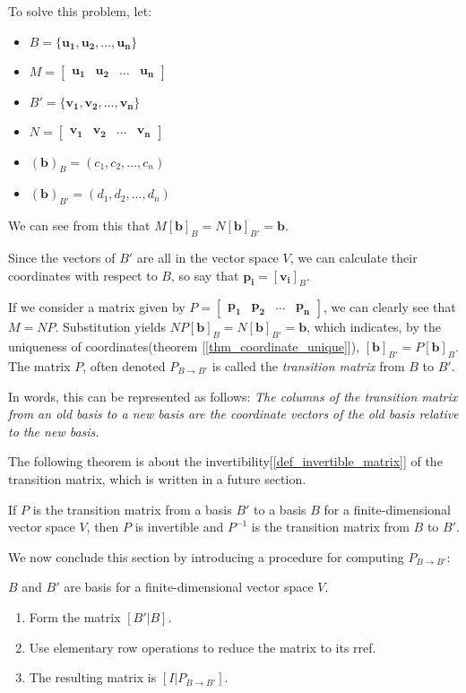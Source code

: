 \documentclass{report}
\begin{document}
	To solve this problem, let:
	\begin{itemize}
		\item $B=\{\bm{u_1},\bm{u_2},\dots,\bm{u_n}\}$
		\item $M=\begin{bmatrix} \bm{u_1} & \bm{u_2} & \dots & \bm{u_n} \end{bmatrix}$
		\item $B'=\{\bm{v_1},\bm{v_2},\dots,\bm{v_n}\}$
		\item $N=\begin{bmatrix} \bm{v_1} & \bm{v_2} & \dots & \bm{v_n} \end{bmatrix}$
		\item $(\bm{b})_B=(c_1,c_2,\dots,c_n)$
		\item $(\bm{b})_{B'}=(d_1,d_2,\dots,d_n)$
	\end{itemize}
	
	We can see from this that $M[\bm{b}]_B=N[\bm{b}]_{B'}=\bm{b}$.
	
	Since the vectors of $B'$ are all in the vector space $V$, we can calculate their coordinates with respect to $B$, so say that $\bm{p_i}=[\bm{v_i}]_B$.
	
	If we consider a matrix given by $P=\begin{bmatrix} \bm{p_1} & \bm{p_2} & \dots & \bm{p_n} \end{bmatrix}$, we can clearly see that $M=NP$. Substitution yields $NP[\bm{b}]_B=N[\bm{b}]_{B'}=\bm{b}$, which indicates, by the uniqueness of coordinates(theorem [\ref{thm_coordinate_unique}]), $[\bm{b}]_{B'}=P[\bm{b}]_B$. The matrix $P$, often denoted $P_{B \rightarrow B'}$ is called the \emph{transition matrix} from $B$ to $B'$.
	
	In words, this can be represented as follows: \textit{The columns of the transition matrix from an old basis to a new basis are the coordinate vectors of the old basis relative to the new basis.}
	
	The following theorem is about the invertibility[\ref{def_invertible_matrix}] of the transition matrix, which is written in a future section.
	
	\begin{thm}
		If $P$ is the transition matrix from a basis $B'$ to a basis $B$ for a finite-dimensional vector space $V$, then $P$ is invertible and $P^{-1}$ is the transition matrix from $B$ to $B'$.
	\end{thm}
	
	We now conclude this section by introducing a procedure for computing $P_{B \rightarrow B'}$:
	\begin{mthd}
		$B$ and $B'$ are basis for a finite-dimensional vector space $V$.
		\begin{enumerate}[label=Step \arabic*.]
			\item Form the matrix $[B'|B]$.
			\item Use elementary row operations to reduce the matrix to its rref.
			\item The resulting matrix is $[I|P_{B\rightarrow B'}]$.
		\end{enumerate}
	\end{mthd}
	
\end{document}

